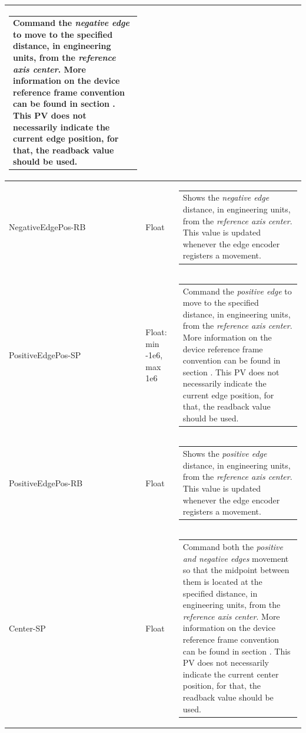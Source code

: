\documentclass[openany]{article}
\begin{document}
\begin{longtable}{| m{4.5cm} m{2.5cm}  m{7.0cm} |}
\begin{tabular}{@{}m{6cm}@{}}
                Command the \emph{negative edge} to move to the specified distance, in engineering units, from the \emph{reference axis center}. More information on the device reference frame convention can be found in section \nameref{sec:dev-reference-frame}. This PV does not necessarily indicate the current edge position, for that, the readback value should be used.
            \end{tabular} \hypertarget{}{}\\ \hline
        NegativeEdgePos-RB & Float & \begin{tabular}{@{}m{6cm}@{}}
                Shows the \emph{negative edge} distance, in engineering units, from the \emph{reference axis center}. This value is updated whenever the edge encoder registers a movement.
            \end{tabular} \hypertarget{pv:positive-edge-pos}{}\\ \hline
        PositiveEdgePos-SP & Float: min -1e6, max 1e6 & \begin{tabular}{@{}m{6cm}@{}}
                Command the \emph{positive edge} to move to the specified distance, in engineering units, from the \emph{reference axis center}. More information on the device reference frame convention can be found in section \nameref{sec:dev-reference-frame}. This PV does not necessarily indicate the current edge position, for that, the readback value should be used.
            \end{tabular} \hypertarget{}{}\\ \hline
        PositiveEdgePos-RB & Float & \begin{tabular}{@{}m{6cm}@{}}
                Shows the \emph{positive edge} distance, in engineering units, from the \emph{reference axis center}. This value is updated whenever the edge encoder registers a movement.
            \end{tabular} \hypertarget{pv:center}{}\\ \hline
        Center-SP & Float & \begin{tabular}{@{}m{6cm}@{}}
                Command both the \emph{positive and negative edges} movement so that the midpoint between them is located at the specified distance, in engineering units, from the \emph{reference axis center}. More information on the device reference frame convention can be found in section \nameref{sec:dev-reference-frame}. This PV does not necessarily indicate the current center position, for that, the readback value should be used.

\end{tabular}
\end{longtable}
\end{document}
